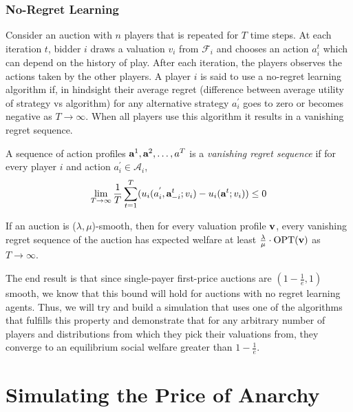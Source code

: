 \documentclass[12pt,twoside]{reedthesis}
\begin{document}
\subsection{No-Regret Learning}
Consider an auction with $n$ players that is repeated for $T$ time steps. At each iteration $t$, bidder $i$ draws a valuation $v_i$ from $\mathcal{F}_i$ and chooses an action $a_i^t$ which can depend on the history of play. After each iteration, the players observes the actions taken by the other players. 
A player $i$ is said to use a no-regret learning algorithm if, in hindsight their average regret (difference between average utility of strategy vs algorithm) for any alternative strategy $a_i^{'}$ goes to zero or becomes negative as $T \rightarrow \infty$. When all players use this algorithm it results in a vanishing regret sequence.

\begin{dfn}
	A sequence of action profiles $\textbf{a}^1 , \textbf{a}^2, \ldots, a^T$ is a \textit{vanishing regret sequence} if for every player $i$ and action $a_i^{'} \in \mathcal{A}_i$,
	$$ \lim\limits_{T \rightarrow \infty} \frac{1}{T} \sum_{t=1}^{T}(u_i(a_i^{'}, \textbf{a}_{-i}^{t};v_i) - u_i(\textbf{a}^t; v_i)) \leq 0$$
	\label{dfn:noregret} 
\end{dfn}

\begin{theorem}
	If an auction is ($\lambda, \mu$)-smooth, then for every valuation profile $\textbf{v}$, every vanishing regret sequence of the auction has expected welfare at least $\frac{\lambda}{\mu} \cdot \text{OPT}(\textbf{v})$ as $T \rightarrow \infty$.  
\end{theorem}

The end result is that since single-payer first-price auctions are $(1-\frac{1}{e}, 1)$ smooth, we know that this bound will hold for auctions with no regret learning agents. Thus, we will try and build a simulation that uses one of the algorithms that fulfills this property and demonstrate that for any arbitrary number of players and distributions from which they pick their valuations from, they converge to an equilibrium social welfare greater than $1-\frac{1}{e}$.

\chapter{Simulating the Price of Anarchy}
\end{document}
